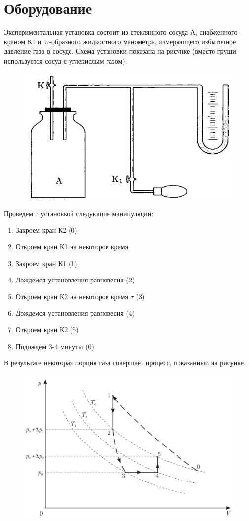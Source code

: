 \section{Оборудование}

Экспериментальная установка состоит из стеклянного сосуда А, снабженного краном К1 и
U-образного жидкостного манометра, измеряющего избыточное давление газа в сосуде.
Схема установки показана на рисунке (вместо груши используется сосуд с углекислым газом).
\begin{figure}[ht!]
    \centering\includegraphics[width=0.8\linewidth]{img/img1.png}
\end{figure}

Проведем с установкой следующие манипуляции:
\begin{enumerate}
    \item Закроем кран К2 (0)
    \item Откроем кран К1 на некоторое время
    \item Закроем кран К1 (1)
    \item Дождемся установления равновесия (2)
    \item Откроем кран К2 на некоторое время $\tau$ (3)
    \item Дождемся установления равновесия (4)
    \item Откроем кран К2 (5)
    \item Подождем 3-4 минуты (0)
\end{enumerate}

В результате некоторая порция газа совершает процесс, показанный на рисунке.
\begin{figure}[ht!]
    \centering\includegraphics[width=0.8\linewidth]{img/img2.png}
\end{figure}

